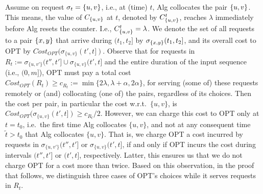 \documentclass[manuscript,screen=true, review, anonymous]{acmart}
\DeclarePairedDelimiter\set{\{}{\}}
\newcommand{\todo}[1]{\noindent\color{brown}{todo: #1}\color{black}}
\begin{document}
Assume on request $\sigma_{t}=\set{u,v}$, 
i.e., at (time) $t$,
Alg collocates the pair $\set{u,v}$.
This means,
the value of $C_{\set{u,v}}$ at $t$,
denoted by $C^t_{\set{u,v}}$, 
reaches $\lambda$ immediately before Alg resets the counter.
I.e.,
$ C^t_{\set{u,v}} = \lambda$.
We denote the set of all requests to a pair $\set{x,y}$ that arrive
during $(t_1,t_2]$ by $\sigma_{\set{x,y}}(t_1,t_2]$,
and its overall cost to OPT by
$\mathit{Cost}_{\mathit{OPT}} (\sigma_{\{u,v\}}(t',t]) $.
%
Observe that for requests in
$R_t := \sigma_{\{u,v'\}}(t'',t'] \cup \sigma_{\{u,v\}}(t',t]$ 
and the entire duration of the input sequence (i.e., $(0,m]$),
OPT must pay a total cost
$\mathit{Cost}_{\mathit{OPT}} (R_t) \geq 
	c_{R_t} := \min{ \{ 2\lambda, \lambda+\alpha, 2\alpha \} }$,
for serving (some of) these requests remotely or (and) collocating (one of) the pairs,
regardless of its choices.
Then the cost per pair, in particular the cost w.r.t.~$\{u,v\}$, is
$\mathit{Cost}_{\mathit{OPT}} (\sigma_{\{u,v\}}(t',t]) \geq c_{R_t} / 2$.
%
However,
we can charge this cost to OPT only at $t=t_0$,
i.e.~the first time Alg collocates $\{u,v\}$,
and not at any consequent time $\tilde{t} > t_0$ that Alg collocates $\{u,v\}$.
That is,
we charge OPT a cost incurred by requests in
$\sigma_{\{u,v'\}}(t'',t']$ or $\sigma_{\{u,v\}}(t',t]$,
if and only if  OPT incurs the cost during  intervals $(t'', t']$ or $(t', t]$,
respectively.	
Latter,
this ensures us that we do not charge OPT for a cost more than twice.
Based on this observation,
in the proof that follows,
we distinguish three cases of OPT's choices
while it serves requests in	$R_t $.

\todo{what is causing this vertical space before proof block??}
\end{document}
